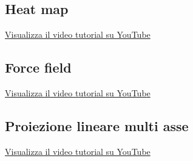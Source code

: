 \subsection{Heat map}
\textcolor{blue}{\href{https://youtu.be/GH6PCy3pm_k}
{Visualizza il video tutorial su YouTube}}

\subsection{Force field}
\textcolor{blue}{\href{https://youtu.be/unLz7DA8gW0}
{Visualizza il video tutorial su YouTube}}

\subsection{Proiezione lineare multi asse}
\textcolor{blue}{\href{https://youtu.be/PISKxPttkQ0}
{Visualizza il video tutorial su YouTube}}


